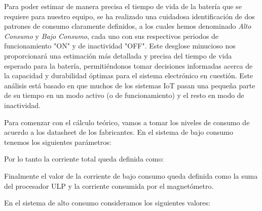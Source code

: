 Para poder estimar de manera precisa el tiempo de vida de la batería que se requiere para nuestro equipo, se ha realizado una cuidadosa identificación de dos patrones de consumo claramente definidos, a los cuales hemos denominado \textit{Alto Consumo} y \textit{Bajo Consumo}, cada uno con sus respectivos periodos de funcionamiento "ON" y de inactividad "OFF". Este desglose minucioso nos proporcionará una estimación más detallada y precisa del tiempo de vida esperado para la batería, permitiéndonos tomar decisiones informadas acerca de la capacidad y durabilidad óptimas para el sistema electrónico en cuestión. Este análisis está basado en que muchos de los sistemas IoT pasan una pequeña parte de su tiempo en un modo activo (o de funcionamiento) y el resto en modo de inactividad.

Para comenzar con el cálculo teórico, vamos a tomar los niveles de consumo de acuerdo a los datasheet de los fabricantes. En el sistema de bajo consumo tenemos los siguientes parámetros:


Por lo tanto la corriente total queda definida como:


Finalmente el valor de la corriente de bajo consumo queda definida como la suma del procesador ULP y la corriente consumida por el magnetómetro.


En el sistema de alto consumo consideramos los siguientes valores:


